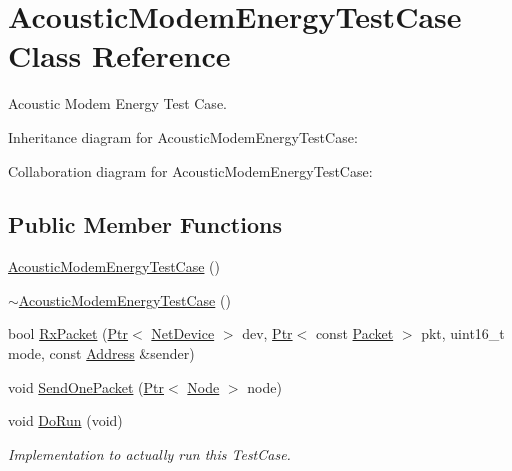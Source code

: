\hypertarget{classAcousticModemEnergyTestCase}{}\section{Acoustic\+Modem\+Energy\+Test\+Case Class Reference}
\label{classAcousticModemEnergyTestCase}


Acoustic Modem Energy Test Case.  




Inheritance diagram for Acoustic\+Modem\+Energy\+Test\+Case\+:


Collaboration diagram for Acoustic\+Modem\+Energy\+Test\+Case\+:
\subsection*{Public Member Functions}
\begin{DoxyCompactItemize}
\item 
\hyperlink{classAcousticModemEnergyTestCase_ae0cad24c0e08ce3b83869d97d2169449}{Acoustic\+Modem\+Energy\+Test\+Case} ()
\item 
\hyperlink{classAcousticModemEnergyTestCase_a90542ab6fa4d110eb668d383d40042ff}{$\sim$\+Acoustic\+Modem\+Energy\+Test\+Case} ()
\item 
bool \hyperlink{classAcousticModemEnergyTestCase_a6fa602231ea18185fdfd28d8fd8b9cdf}{Rx\+Packet} (\hyperlink{classns3_1_1Ptr}{Ptr}$<$ \hyperlink{classns3_1_1NetDevice}{Net\+Device} $>$ dev, \hyperlink{classns3_1_1Ptr}{Ptr}$<$ const \hyperlink{classns3_1_1Packet}{Packet} $>$ pkt, uint16\+\_\+t mode, const \hyperlink{classns3_1_1Address}{Address} \&sender)
\item 
void \hyperlink{classAcousticModemEnergyTestCase_a540ee1e0ec5812bbeb11c3ead857db1f}{Send\+One\+Packet} (\hyperlink{classns3_1_1Ptr}{Ptr}$<$ \hyperlink{classns3_1_1Node}{Node} $>$ node)
\item 
void \hyperlink{classAcousticModemEnergyTestCase_a80af809d98008abfde814665ff5a3257}{Do\+Run} (void)
\begin{DoxyCompactList}\small\item\em Implementation to actually run this Test\+Case. \end{DoxyCompactList}\end{DoxyCompactItemize}
